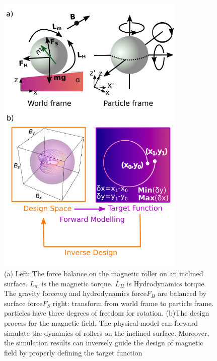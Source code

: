 \begin{figure}[p]
\centering
\includegraphics[width=9cm]{figures/5_2.pdf}
\caption{ (a) Left: The force balance on the magnetic roller on an inclined surface. $L_m$ is the magnetic torque. $L_H$ is Hydrodynamics torque. The gravity force$mg$ and hydrodynamics force$F_H$ are balanced by surface force$F_S$   right: transform from world frame to particle frame. particles have three degrees of freedom for rotation. (b)The design process for the magnetic field. The physical model can forward simulate the dynamics of rollers on the inclined surface. Moreover, the simulation results can inversely guide the design of magnetic field by properly defining the target function}
\label{fig:5.2}
\end{figure}
